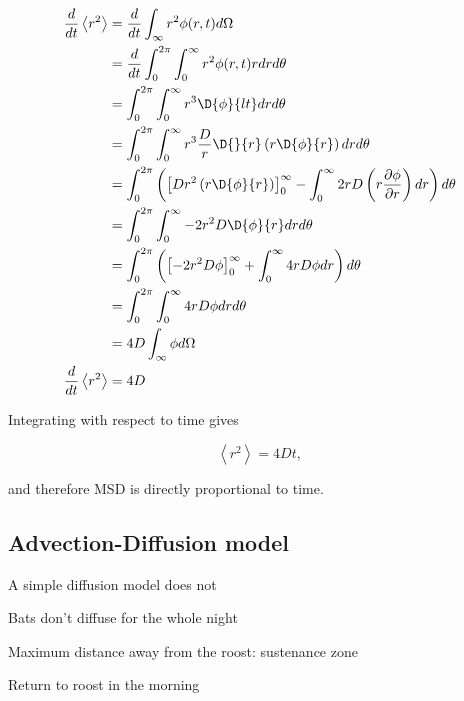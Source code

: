 \begin{equation}
\begin{split}
\frac{d}{dt} \left<r^2\right> &= \frac{d}{dt}\int_{\infty}r^2 \phi(r,t) d\Omega \\
                            &= \frac{d}{dt} \int_0^{2\pi}\int_0^{\infty} r^2 \phi(r,t) r dr d\theta \\
                           &= \int_0^{2\pi} \int_0^{\infty} r^3 \D{\phi}{l t} dr d\theta \\
                            &= \int_0^{2\pi} \int_0^{\infty} r^3 \frac{D}{r} \D{}{r } \left( r \D{ \phi}{ r}\right) dr d\theta \\
                            &= \int_0^{2\pi} \left( \left[ D r^2 \left( r \D{ \phi}{ r}\right) \right]_0^{\infty} - \int_0^{\infty} 2rD \left(r \frac{\partial \phi}{\partial r} \right) dr \right) d\theta \\
                            &= \int_0^{2\pi} \int_0^{\infty} -2r^2D \D{ \phi}{r}dr d\theta \\
                            &= \int_0^{2\pi} \left( \left[-2r^2D \phi \right]_0^{\infty} + \int_0^{\infty} 4rD \phi dr \right)d\theta \\
                            &= \int_0^{2\pi} \int_0^{\infty} 4rD\phi dr d\theta \\
                            &= 4D \int_{\infty} \phi d\Omega \\
\frac{d}{dt} \left<r^2\right>  &= 4D \\
\label{eqn:diffusion_1}
\end{split}
\end{equation}

Integrating with respect to time gives

\begin{equation}
\left<r^2\right> = 4Dt ,
\label{eqn:diffusion_msd}
\end{equation}

and therefore MSD is directly proportional to time.


\subsection{Advection-Diffusion model}

A simple diffusion model does not

Bats don't diffuse for the whole night

Maximum distance away from the roost: sustenance zone

Return to roost in the morning

